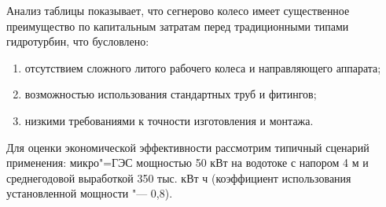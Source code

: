Анализ таблицы показывает, что сегнерово колесо имеет существенное
преимущество по капитальным затратам перед традиционными типами гидротурбин, что
бусловлено:
\begin{enumerate}
    \renewcommand{\labelenumi}{\arabic{enumi})}
    \item отсутствием сложного литого рабочего колеса и направляющего аппарата;
    \item возможностью использования стандартных труб и фитингов;
    \item низкими требованиями к точности изготовления и монтажа.
\end{enumerate}
	Для оценки экономической эффективности рассмотрим типичный сценарий применения: микро"=ГЭС мощностью 50 кВт на водотоке с напором 4 м и среднегодовой выработкой 350 тыс. кВт ч (коэффициент использования установленной мощности "--- 0,8).

